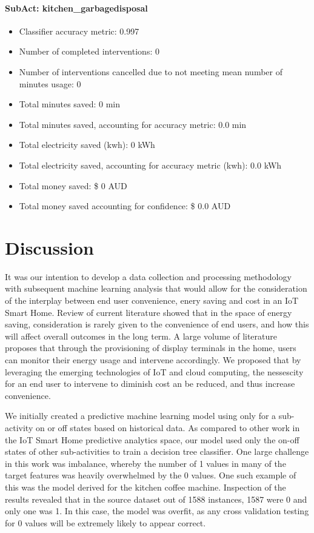 \documentclass[11pt,]{article}
\providecommand{\tightlist}{%
  \setlength{\itemsep}{0pt}\setlength{\parskip}{0pt}}
\let\oldparagraph\paragraph
\renewcommand{\paragraph}[1]{\oldparagraph{#1}\mbox{}}
\begin{document}
\hypertarget{subact-kitchen_garbagedisposal}{%
\paragraph{SubAct:
kitchen\_garbagedisposal}\label{subact-kitchen_garbagedisposal}}

\begin{itemize}
\tightlist
\item
  Classifier accuracy metric: 0.997
\item
  Number of completed interventions: 0
\item
  Number of interventions cancelled due to not meeting mean number of
  minutes usage: 0
\item
  Total minutes saved: 0 min
\item
  Total minutes saved, accounting for accuracy metric: 0.0 min
\item
  Total electricity saved (kwh): 0 kWh
\item
  Total electricity saved, accounting for accuracy metric (kwh): 0.0 kWh
\item
  Total money saved: \$ 0 AUD
\item
  Total money saved accounting for confidence: \$ 0.0 AUD
\end{itemize}

\hypertarget{discussion}{%
\section{Discussion}\label{discussion}}

It was our intention to develop a data collection and processing
methodology with subsequent machine learning analysis that would allow
for the consideration of the interplay between end user convenience,
enery saving and cost in an IoT Smart Home. Review of current literature
showed that in the space of energy saving, consideration is rarely given
to the convenience of end users, and how this will affect overall
outcomes in the long term. A large volume of literature proposes that
through the provisioning of display terminals in the home, users can
monitor their energy usage and intervene accordingly. We proposed that
by leveraging the emerging technologies of IoT and cloud computing, the
nessescity for an end user to intervene to diminish cost an be reduced,
and thus increase convenience.

We initially created a predictive machine learning model using only for
a sub-activity on or off states based on historical data. As compared to
other work in the IoT Smart Home predictive analytics space, our model
used only the on-off states of other sub-activities to train a decision
tree classifier. One large challenge in this work was imbalance, whereby
the number of 1 values in many of the target features was heavily
overwhelmed by the 0 values. One such example of this was the model
derived for the kitchen coffee machine. Inspection of the results
revealed that in the source dataset out of 1588 instances, 1587 were 0
and only one was 1. In this case, the model was overfit, as any cross
validation testing for 0 values will be extremely likely to appear
correct.
\end{document}
